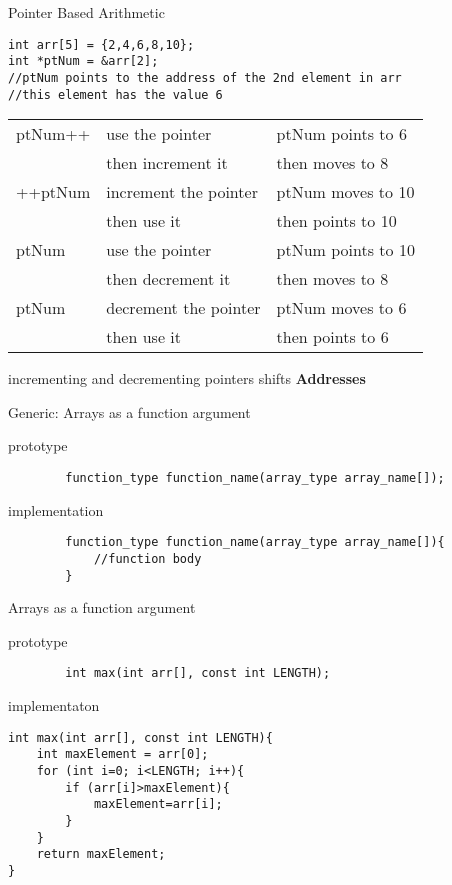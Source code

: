 \documentclass[xcolor={dvipsnames}]{beamer}
\begin{document}
\begin{frame}[fragile]{Pointer Based Arithmetic}
\begin{block}{}
	\begin{verbatim}
int arr[5] = {2,4,6,8,10};
int *ptNum = &arr[2];
//ptNum points to the address of the 2nd element in arr
//this element has the value 6
	\end{verbatim}
\end{block}

\begin{tabular}{|l|l|l|}
\hline
ptNum++ & use the pointer & ptNum points to 6\\
                   & then increment it  & then moves to 8 \\
\hline
++ptNum & increment the pointer & ptNum moves to 10\\
		   & then use it & then points to 10\\
\hline
ptNum\text{-}\text{-} & use the pointer & ptNum points to 10\\
				 & then decrement it & then moves to 8\\
\hline
\text{-}\text{-}ptNum & decrement the pointer & ptNum moves to 6\\
		& then use it & then points to 6\\
\hline
\end{tabular}
\center
\alert{incrementing and decrementing pointers shifts \textbf{Addresses}}
\end{frame}

\begin{frame}[fragile]{Generic: Arrays as a function argument}
	\begin{block}{prototype}
	\begin{verbatim}
		function_type function_name(array_type array_name[]);
	\end{verbatim}
	\end{block}
	\pause
	\begin{block}{implementation}
	\begin{verbatim}
		function_type function_name(array_type array_name[]){
			//function body
		}
	\end{verbatim}
	\end{block}
\end{frame}

\begin{frame}[fragile]{Arrays as a function argument}
	\begin{block}{prototype}
	\begin{verbatim}
		int max(int arr[], const int LENGTH);
	\end{verbatim}
	\end{block}
	\pause
	\begin{block}{implementaton}
	\begin{verbatim}
int max(int arr[], const int LENGTH){
    int maxElement = arr[0];
    for (int i=0; i<LENGTH; i++){
        if (arr[i]>maxElement){
            maxElement=arr[i];
        }
    }
    return maxElement; 
}
	\end{verbatim}
	\end{block}
\end{frame}
\end{document}

